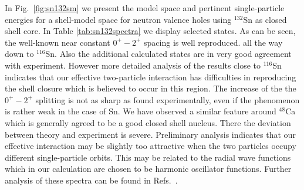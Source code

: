 \documentclass{article}
\begin{document}
In Fig.~\ref{fig:sn132sm} we present the model space and pertinent single-particle energies
for a shell-model space for neutron valence holes using $^{132}$Sn as closed shell core.
In Table \ref{tab:sn132spectra} we display  
selected states. 
As can be seen, 
the well-known
near constant $0^{+} - 2^{+}$ spacing is well reproduced.
all the way down to
$^{116}$Sn.
Also the additional calculated states are in very good agreement
with experiment. However more detailed analysis of
the results close to $^{116}$Sn
indicates that our effective two-particle interaction
has difficulties in reproducing
the shell closure which is believed to occur in this region.
The increase of the
the $0^{+} - 2^{+}$ splitting is not as sharp as found
experimentally, even if the
phenomenon is rather weak in the case of Sn.
We have observed a similar feature around $^{48}$Ca \cite{hko95}
which is generally agreed
to be a good closed shell nucleus. There the deviation
between theory and experiment
is severe. Preliminary analysis indicates that our effective interaction
may be slightly too attractive when the two particles
occupy different single-particle orbits.
This may be related to the radial wave functions which in our calculation are
chosen to be harmonic oscillator functions. Further analysis of these spectra
can be found in Refs.~\cite{ehho98,haavard2004}.
\end{document}
